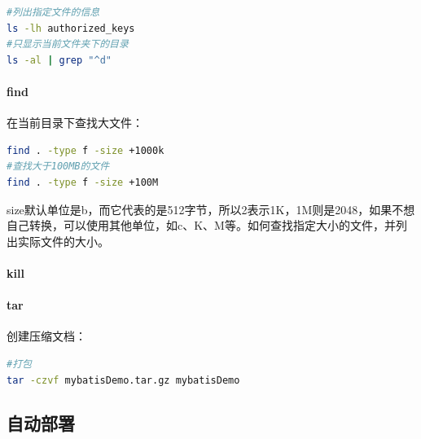 \documentclass[letter]{book}
\begin{document}
\begin{lstlisting}[language=Bash]
#列出指定文件的信息
ls -lh authorized_keys
#只显示当前文件夹下的目录
ls -al | grep "^d"
\end{lstlisting}


\paragraph{find}

在当前目录下查找大文件：

\begin{lstlisting}[language=Bash]
find . -type f -size +1000k
#查找大于100MB的文件
find . -type f -size +100M
\end{lstlisting}

size默认单位是b，而它代表的是512字节，所以2表示1K，1M则是2048，如果不想自己转换，可以使用其他单位，如c、K、M等。如何查找指定大小的文件，并列出实际文件的大小。

\paragraph{kill}

\paragraph{tar}

创建压缩文档：

\begin{lstlisting}[language=Bash]
#打包
tar -czvf mybatisDemo.tar.gz mybatisDemo
\end{lstlisting}



\subsection{自动部署}
\end{document}
